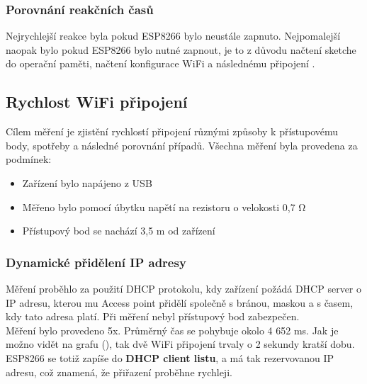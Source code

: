 \documentclass[a4paper, 12pt]{report}
\begin{document}

				\subsubsection{Porovnání reakčních časů}
					Nejrychlejší reakce byla pokud ESP8266 bylo neustále zapnuto. Nejpomalejší naopak bylo pokud ESP8266 bylo nutné zapnout, je to z důvodu načtení sketche do operační paměti, načtení konfigurace WiFi a následnému připojení .

			\subsection{Rychlost WiFi připojení}
				Cílem měření je zjistění rychlostí připojení různými způsoby k přístupovému body, spotřeby a následné porovnání případů. Všechna měření byla provedena za podmínek:

				\begin{itemize}
					\item Zařízení bylo napájeno z USB
					\item Měřeno bylo pomocí úbytku napětí na rezistoru o velokosti 0,7 \si{\ohm}
					\item Přístupový bod se nachází 3,5 \si{m} od zařízení
				\end{itemize}

				\subsubsection{Dynamické přidělení IP adresy}
					Měření proběhlo za použití DHCP protokolu, kdy zařízení požádá DHCP server o IP adresu, kterou mu Access point přidělí společně s bránou, maskou a s časem, kdy tato adresa platí. Při měření nebyl přístupový bod zabezpečen.\\
					Měření bylo provedeno 5x. Průměrný čas se pohybuje okolo 4 652 \si{ms}. Jak je možno vidět na grafu (), tak dvě WiFi připojení trvaly o 2 sekundy kratší dobu. ESP8266 se totiž zapíše do \textbf{DHCP client listu}, a má tak rezervovanou IP adresu, což znamená, že přiřazení proběhne rychleji.
\end{document}
